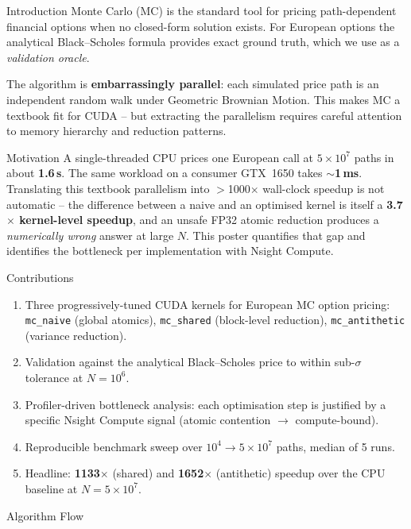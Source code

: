 \documentclass[portrait,a0b,final]{a0poster}
\begin{document}
\noindent
\begin{minipage}[t]{0.315\textwidth}

\begin{posterblock}{Introduction}
Monte Carlo (MC) is the standard tool for pricing path-dependent
financial options when no closed-form solution exists. For European
options the analytical Black--Scholes formula provides exact ground
truth, which we use as a \emph{validation oracle}.
\par\medskip
The algorithm is \textbf{embarrassingly parallel}: each simulated
price path is an independent random walk under Geometric Brownian
Motion. This makes MC a textbook fit for CUDA -- but extracting the
parallelism requires careful attention to memory hierarchy and
reduction patterns.
\end{posterblock}

\begin{posterblock}{Motivation}
A single-threaded CPU prices one European call at $5\times10^{7}$
paths in about \textbf{1.6\,s}. The same workload on a consumer
GTX~1650 takes \textbf{$\sim$1\,ms}. Translating this textbook
parallelism into $>$1000$\times$ wall-clock speedup is not automatic
-- the difference between a naive and an optimised kernel is itself a
\textbf{3.7$\times$ kernel-level speedup}, and an unsafe FP32 atomic
reduction produces a \emph{numerically wrong} answer at large $N$.
This poster quantifies that gap and identifies the bottleneck per
implementation with Nsight Compute.
\end{posterblock}

\begin{posterblock}{Contributions}
\begin{enumerate}
\item Three progressively-tuned CUDA kernels for European MC option
      pricing: \texttt{mc\_naive} (global atomics), \texttt{mc\_shared}
      (block-level reduction), \texttt{mc\_antithetic} (variance
      reduction).
\item Validation against the analytical Black--Scholes price to
      within sub-$\sigma$ tolerance at $N=10^{6}$.
\item Profiler-driven bottleneck analysis: each optimisation step is
      justified by a specific Nsight Compute signal (atomic
      contention $\rightarrow$ compute-bound).
\item Reproducible benchmark sweep over $10^{4}\!\rightarrow\!5\times10^{7}$
      paths, median of 5 runs.
\item Headline: \textbf{1133$\times$} (shared) and
      \textbf{1652$\times$} (antithetic) speedup over the CPU
      baseline at $N=5\times10^{7}$.
\end{enumerate}
\end{posterblock}

\begin{posterblock}{Algorithm Flow}

\end{posterblock}

\end{minipage}%
\end{document}
